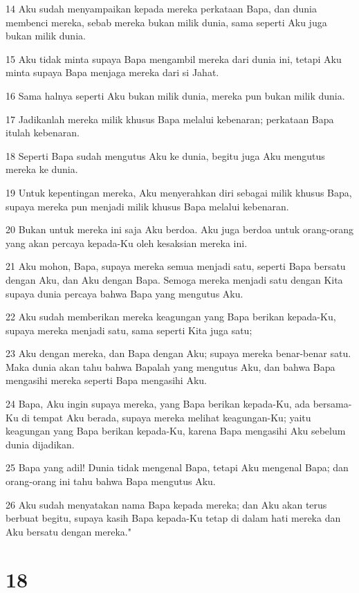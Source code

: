 \par 14 Aku sudah menyampaikan kepada mereka perkataan Bapa, dan dunia membenci mereka, sebab mereka bukan milik dunia, sama seperti Aku juga bukan milik dunia.
\par 15 Aku tidak minta supaya Bapa mengambil mereka dari dunia ini, tetapi Aku minta supaya Bapa menjaga mereka dari si Jahat.
\par 16 Sama halnya seperti Aku bukan milik dunia, mereka pun bukan milik dunia.
\par 17 Jadikanlah mereka milik khusus Bapa melalui kebenaran; perkataan Bapa itulah kebenaran.
\par 18 Seperti Bapa sudah mengutus Aku ke dunia, begitu juga Aku mengutus mereka ke dunia.
\par 19 Untuk kepentingan mereka, Aku menyerahkan diri sebagai milik khusus Bapa, supaya mereka pun menjadi milik khusus Bapa melalui kebenaran.
\par 20 Bukan untuk mereka ini saja Aku berdoa. Aku juga berdoa untuk orang-orang yang akan percaya kepada-Ku oleh kesaksian mereka ini.
\par 21 Aku mohon, Bapa, supaya mereka semua menjadi satu, seperti Bapa bersatu dengan Aku, dan Aku dengan Bapa. Semoga mereka menjadi satu dengan Kita supaya dunia percaya bahwa Bapa yang mengutus Aku.
\par 22 Aku sudah memberikan mereka keagungan yang Bapa berikan kepada-Ku, supaya mereka menjadi satu, sama seperti Kita juga satu;
\par 23 Aku dengan mereka, dan Bapa dengan Aku; supaya mereka benar-benar satu. Maka dunia akan tahu bahwa Bapalah yang mengutus Aku, dan bahwa Bapa mengasihi mereka seperti Bapa mengasihi Aku.
\par 24 Bapa, Aku ingin supaya mereka, yang Bapa berikan kepada-Ku, ada bersama-Ku di tempat Aku berada, supaya mereka melihat keagungan-Ku; yaitu keagungan yang Bapa berikan kepada-Ku, karena Bapa mengasihi Aku sebelum dunia dijadikan.
\par 25 Bapa yang adil! Dunia tidak mengenal Bapa, tetapi Aku mengenal Bapa; dan orang-orang ini tahu bahwa Bapa mengutus Aku.
\par 26 Aku sudah menyatakan nama Bapa kepada mereka; dan Aku akan terus berbuat begitu, supaya kasih Bapa kepada-Ku tetap di dalam hati mereka dan Aku bersatu dengan mereka."

\chapter{18}

